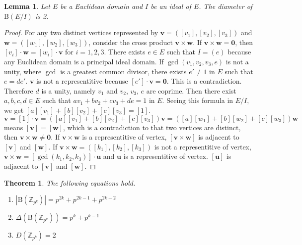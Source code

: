 \documentclass{article}
\newtheorem{Lem}{Lemma}
\newtheorem*{Th}{Theorem}
\newcommand{\Z}{\mathbb Z}
\newcommand{\B}{\mathrm{B}}
\begin{document}
\begin{Lem}\label{Lem:diameter}
Let $E$ be a Euclidean domain and $I$ be an ideal of $E$. The diameter of $\B(E/I)$ is 2.
\end{Lem}

\begin{proof}
For any two distinct vertices represented by $\bm v = ([v_1],[v_2],[v_3])$ and $\bm w=([w_1],[w_2],[w_3])$, consider the cross product $\bm v \times \bm w$. 
If $\bm v \times \bm w = \bm 0$, then $[v_i] \cdot \bm w = [w_i] \cdot \bm v$ for $i=1,2,3$. 
There exists $e \in E$ such that $I = (e)$ because any Euclidean domain is a principal ideal domain.
If $\gcd(v_1,v_2,v_3,e)$ is not a unity, where $\gcd$ is a greatest common divisor, 
there exists $e' \neq 1$ in $E$ such that $e=de'$. 
$\bm v$ is not a representitive because $[e'] \cdot \bm v = \bm 0$. 
This is a contradiction. Therefore $d$ is a unity, namely $v_1$ and $v_2$, $v_3$, $e$ are coprime.
Then there exist $a, b, c, d \in E$ such that $ a v_1 + b v_2 + c v_3 + d e = 1$ in $E$.
Seeing this formula in $E/I$, we get $[a] [v_1] + [b] [v_2] + [c] [v_3] = [1]$.
\[ \bm v = [1] \cdot \bm v = ( [a] [v_1] + [b] [v_2] + [c] [v_3] ) \bm v = ( [a] [w_1] + [b] [w_2] + [c] [w_3] ) \bm w\]
means $[\bm v] = [\bm w]$, which is a contradiction to that two vertices are distinct, then $\bm v \times \bm w \neq \bm 0$. 
If $\bm v \times \bm w$ is a representitive of vertex, $[\bm v \times \bm w]$ is adjacent to $[\bm v]$ and $[\bm w]$.
If $\bm v \times \bm w = ([k_1],[k_2],[k_3])$ is not a representitive of vertex,
$\bm v \times \bm w = [\gcd(k_1,k_2,k_3)] \cdot \bm u$ and $\bm u$ is a representitive of vertex. $[\bm u]$ is adjacent to $[\bm v]$ and $[\bm w]$.
\end{proof}

\begin{Th}\label{Th:main}
The following equations hold.
\begin{enumerate}
\item $ |\B(\Z_{p^k})| = p^{2k}+p^{2k-1}+p^{2k-2} $
\item $ \Delta(\B(\Z_{p^k})) = p^k + p^{k-1} $
\item $ D(\Z_{p^k}) = 2$
\end{enumerate}
\end{Th}
\end{document}
